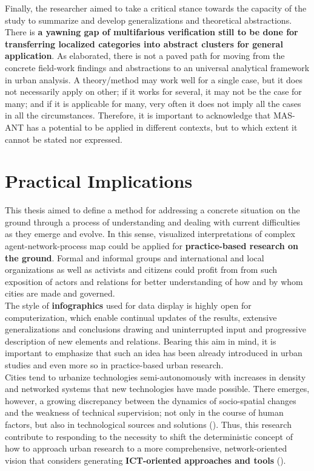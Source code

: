 \documentclass[11pt]{report}
\begin{document}
{Finally, the researcher aimed to take a critical stance towards the capacity of the study to summarize and develop generalizations and theoretical abstractions.
There is \textbf{a yawning gap of multifarious verification still to be done for transferring localized categories into abstract clusters for general application}.
As \href{Robinson}{\citealt{robinson_urban_2013}} elaborated, there is not a paved path for moving from the concrete field-work findings and abstractions to an universal analytical framework in urban analysis. A theory/method may work well for a single case, but it does not necessarily apply on other; if it works for several, it may not be the case for many; and if it is applicable for many, very often it does not imply all the cases in all the circumstances.
Therefore, it is important to acknowledge that MAS-ANT has a potential to be applied in different contexts, but to which extent it cannot be stated nor expressed.


\section{Practical Implications}

This thesis aimed to define a method for addressing a concrete situation on the ground through a process of understanding and dealing with current difficulties as they emerge and evolve.
In this sense, visualized interpretations of complex agent-network-process map could be applied for \textbf{practice-based research on the ground}.
Formal and informal groups and international and local organizations as well as activists and citizens could profit from from such exposition of actors and relations for better understanding of how and by whom cities are made and governed.
\\

The style of \textbf{infographics} used for data display is highly open for computerization, which enable continual updates of the results, extensive generalizations and conclusions drawing and uninterrupted input and progressive description of new elements and relations.
Bearing this aim in mind, it is important to emphasize that such an idea has been already introduced in urban studies and even more so in practice-based urban research.
\\

Cities tend to urbanize technologies semi-autonomously with increases in density and networked systems that new technologies have made possible.
There emerges, however, a growing discrepancy between the dynamics of socio-spatial changes and the weakness of technical supervision; not only in the course of human factors, but also in technological sources and solutions (\href{Vauquelin}{\citealt{vauquelin_planification_2010}}).
Thus, this research contribute to responding to the necessity to shift the deterministic concept of how to approach urban research to a more comprehensive, network-oriented vision that considers generating \textbf{ICT-oriented approaches and tools} (\href{Huang}{\citealt{huang_ict-oriented_2012}}).
\\

}
\end{document}
